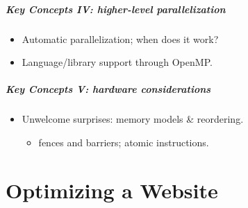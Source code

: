 \documentclass[aspectratio=43]{beamer}
\newenvironment{changemargin}[1]{%
  \begin{list}{}{%
    \setlength{\topsep}{0pt}%
    \setlength{\leftmargin}{#1}%
    \setlength{\rightmargin}{1em}
    \setlength{\listparindent}{\parindent}%
    \setlength{\itemindent}{\parindent}%
    \setlength{\parsep}{\parskip}%
  }%
  \item[]}{\end{list}}
\begin{document}
\begin{frame}
  \frametitle{Key Concepts IV: higher-level parallelization}

  \begin{changemargin}{2cm}
  \begin{itemize}
    \item Automatic parallelization; when does it work?

    \item Language/library support through OpenMP.
  \end{itemize}
  \end{changemargin}
\end{frame}

\begin{frame}
  \frametitle{Key Concepts V: hardware considerations}

  \begin{changemargin}{2cm}
  \begin{itemize}
    \item Unwelcome surprises: memory models \& reordering.
      \begin{itemize}
        \item fences and barriers; atomic instructions.
      \end{itemize}
  \end{itemize}
  \end{changemargin}
\end{frame}

\part{Optimizing a Website}
\frame{\partpage}
\end{document}
